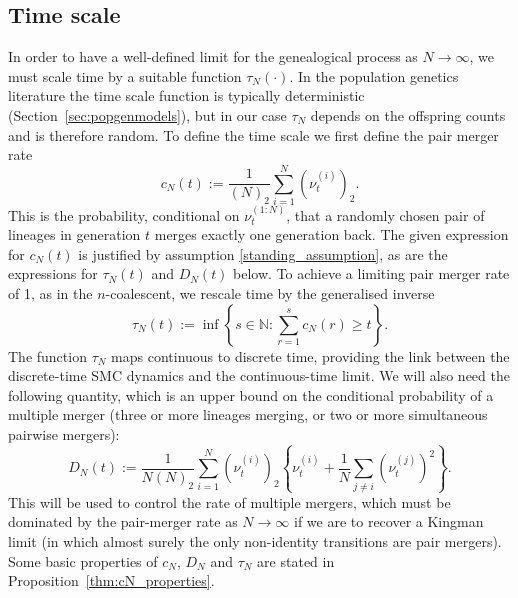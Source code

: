 \subsection{Time scale}
In order to have a well-defined limit for the genealogical process as $N\to\infty$, we must scale time by a suitable function $\tau_N(\cdot)$. In the population genetics literature the time scale function is typically deterministic (Section~\ref{sec:popgenmodels}), but in our case $\tau_N$ depends on the offspring counts and is therefore random.
To define the time scale we first define the pair merger rate
\begin{equation}\label{eq:defn_cN}
c_N(t) := \frac{1}{(N)_2} \sum_{i=1}^N (\nu_t^{(i)})_2 .
\end{equation}
This is the probability, conditional on $\nu_t^{(1:N)}$, that a randomly chosen pair of lineages in generation $t$ merges exactly one generation back.
The given expression for $c_N(t)$ is justified by assumption \ref{standing_assumption},  as are the expressions for $\tau_N(t)$ and $D_N(t)$ below.
To achieve a limiting pair merger rate of 1, as in the $n$-coalescent, we rescale time by the generalised inverse
\begin{equation}\label{eq:defn_tauN}
\tau_N(t) := \inf \left\{ s \in \mathbb{N} : \sum_{r=1}^s c_N(r) \geq t \right\} .
\end{equation}
The function $\tau_N$ maps continuous to discrete time, providing the link between the discrete-time SMC dynamics and the continuous-time limit.
We will also need the following quantity, which is an upper bound on the conditional probability of a multiple merger (three or more lineages merging, or two or more simultaneous pairwise mergers):
\begin{equation}\label{eq:defn_DN}
D_N(t) := \frac{1}{N(N)_2} \sum_{i=1}^N (\nu_t^{(i)})_2
        \left\{ \nu_t^{(i)} + \frac{1}{N} \sum_{j\neq i} (\nu_t^{(j)})^2 \right\} .
\end{equation} 
This will be used to control the rate of multiple mergers, which must be dominated by the pair-merger rate as $N\to\infty$ if we are to recover a Kingman limit (in which almost surely the only non-identity transitions are pair mergers).
Some basic properties of $c_N$, $D_N$ and $\tau_N$ are stated in Proposition~\ref{thm:cN_properties}.
